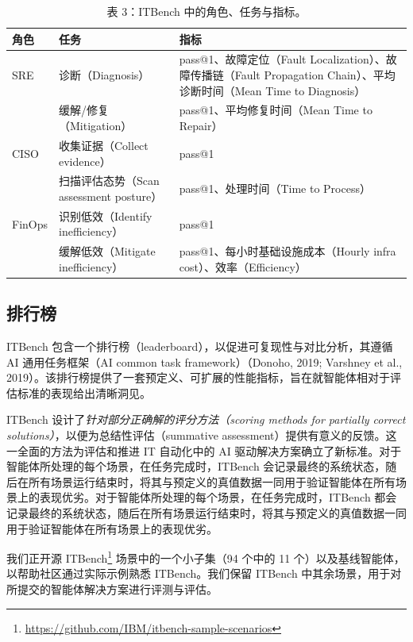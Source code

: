\documentclass[10pt,UTF8,fontset=fandol]{ctexart}
\begin{document}
\begin{table}[H]
\centering
\caption{表 3：ITBench 中的角色、任务与指标。}
\label{tab:personas-tasks}
\begin{tabular}{lll}
\toprule
\textbf{角色} & \textbf{任务} & \textbf{指标} \\
\midrule
SRE & 诊断（Diagnosis） & pass@1、故障定位（Fault Localization）、故障传播链（Fault Propagation Chain）、平均诊断时间（Mean Time to Diagnosis） \\
    & 缓解/修复（Mitigation） & pass@1、平均修复时间（Mean Time to Repair） \\
\midrule
CISO & 收集证据（Collect evidence） & pass@1 \\
     & 扫描评估态势（Scan assessment posture） & pass@1、处理时间（Time to Process） \\
\midrule
FinOps & 识别低效（Identify inefficiency） & pass@1 \\
       & 缓解低效（Mitigate inefficiency） & pass@1、每小时基础设施成本（Hourly infra cost）、效率（Efficiency） \\
\bottomrule
\end{tabular}
\end{table}

\subsection{排行榜}

ITBench 包含一个排行榜（leaderboard），以促进可复现性与对比分析，其遵循 AI 通用任务框架（AI common task framework）（Donoho, 2019; Varshney et al., 2019）。该排行榜提供了一套预定义、可扩展的性能指标，旨在就智能体相对于评估标准的表现给出清晰洞见。

ITBench 设计了\emph{针对部分正确解的评分方法（scoring methods for partially correct solutions）}，以便为总结性评估（summative assessment）提供有意义的反馈。这一全面的方法为评估和推进 IT 自动化中的 AI 驱动解决方案确立了新标准。对于智能体所处理的每个场景，在任务完成时，ITBench 会记录最终的系统状态，随后在所有场景运行结束时，将其与预定义的真值数据一同用于验证智能体在所有场景上的表现优劣。对于智能体所处理的每个场景，在任务完成时，ITBench 都会记录最终的系统状态，随后在所有场景运行结束时，将其与预定义的真值数据一同用于验证智能体在所有场景上的表现优劣。

我们正开源 ITBench\footnote{\url{https://github.com/IBM/itbench-sample-scenarios}} 场景中的一个小子集（94 个中的 11 个）以及基线智能体，以帮助社区通过实际示例熟悉 ITBench。我们保留 ITBench 中其余场景，用于对所提交的智能体解决方案进行评测与评估。
\end{document}
